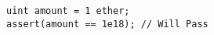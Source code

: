 \begin{lstlisting}[language=Solidity]
uint amount = 1 ether;
assert(amount == 1e18); // Will Pass

\end{lstlisting}